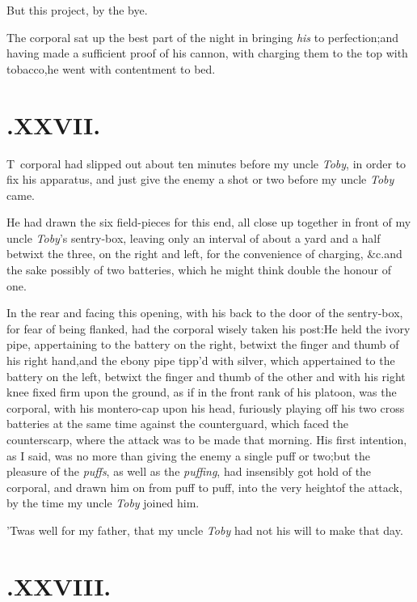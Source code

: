\documentclass{article}
\begin{document}
\tsh But this project, by the bye.

The corporal sat up the best part of the night in bringing
\textit{his} to perfection;\pb and having made a sufficient proof of his cannon,
with charging them to the top with tobacco,\tsk he went with
contentment to bed.

\enlargethispage{2\baselineskip}
\section{.\enspace XXVII.}

\lettrine{T}{\,} corporal had slipped out about
ten minutes before my uncle \textit{Toby}, in order to fix his
apparatus, and just give the enemy a shot or two before my uncle
\textit{Toby} came.

He had drawn the six field-pieces for this end, all close up
together in front of my uncle \textit{Toby}’s sentry-box,
leaving only an interval of about a yard and a half betwixt the
three, on the right and left, for the convenience of charging,
\&c.\tsk and the sake possibly of two batteries, which he
might think double the honour of one.

In the rear and facing this opening, with his back to the door
of the sentry-\pb box, for fear of being flanked, had the corporal
wisely taken his post:\tsh He held the ivory pipe, appertaining to the battery on
the right, betwixt the finger and thumb of his right
hand,\tsk and the ebony pipe tipp’d with silver, which
appertained to the battery on the left, betwixt the finger and
thumb of the other\break
\tsh and with his right knee fixed firm
upon the ground, as if in the front rank of his platoon, was the
corporal, with his montero-cap upon his head, furiously playing off
his two cross batteries at the same time against the counterguard,
which faced the counterscarp, where the attack was to be made that
morning.\break
His first intention, as I said, was no more than giving
the enemy a single puff or two;\tsk but the pleasure of the
\textit{puffs}, as well as the \textit{puffing}, had insensibly got
hold of the corporal, and drawn him on from puff to puff, into the
very height\pb of the attack, by the time my uncle \textit{Toby} joined
him.

’Twas well for my father, that my uncle \textit{Toby} had
not his will to make that day.

\section{.\enspace XXVIII.}
\end{document}
